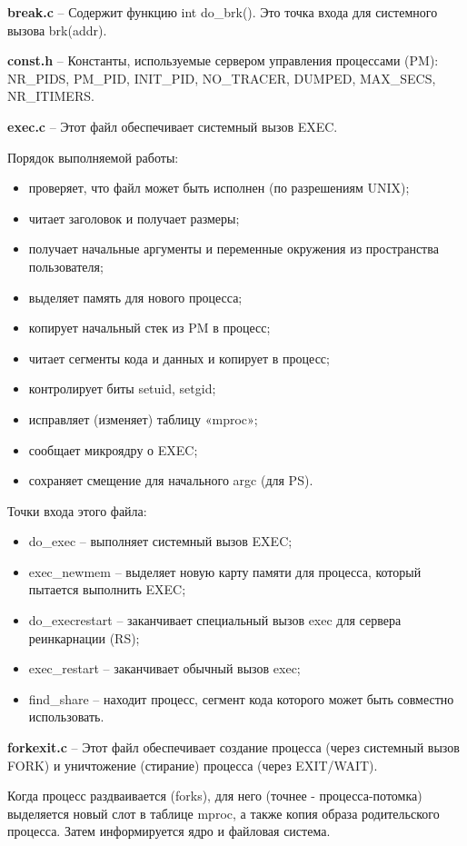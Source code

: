 \textbf{break.c} -- Содержит функцию int do\_brk(). Это точка входа для системного вызова brk(addr).

\textbf{const.h} -- Константы, используемые сервером управления процессами (PM): NR\_PIDS, PM\_PID, INIT\_PID, NO\_TRACER, DUMPED, MAX\_SECS, NR\_ITIMERS.

\textbf{exec.c} -- Этот файл обеспечивает системный вызов EXEC.

Порядок выполняемой работы:
\begin{itemize}
\item проверяет, что файл может быть исполнен (по разрешениям UNIX);
\item читает заголовок и получает размеры;
\item получает начальные аргументы и переменные окружения из пространства пользователя;
\item выделяет память для нового процесса;
\item копирует начальный стек из PM в процесс;
\item читает сегменты кода и данных и копирует в процесс;
\item контролирует биты setuid, setgid;
\item исправляет (изменяет) таблицу «mproc»;
\item сообщает микроядру о EXEC;
\item сохраняет смещение для начального argc (для PS).
\end{itemize}

Точки входа этого файла:
\begin{itemize}
\item do\_exec -- выполняет системный вызов EXEC;
\item exec\_newmem -- выделяет новую карту памяти для процесса, который пытается выполнить EXEC;
\item do\_execrestart -- заканчивает специальный вызов exec для сервера реинкарнации (RS);
\item exec\_restart -- заканчивает обычный вызов exec;
\item find\_share -- находит процесс, сегмент кода которого может быть совместно использовать.
\end{itemize}

\textbf{forkexit.c} -- Этот файл обеспечивает создание процесса (через системный вызов FORK) и уничтожение (стирание) процесса (через EXIT/WAIT).

Когда процесс раздваивается (forks), для него (точнее - процесса-потомка) выделяется новый слот в таблице mproc, а также копия образа родительского процесса. Затем информируется ядро и файловая система.

